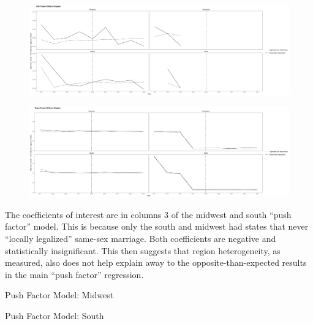 \documentclass[12pt,letterpaper]{article}
\begin{document}
\begin{figure}[p]
    \centering
    \includegraphics[width=1\linewidth]{outputs/summary_stats/region_post_diffs.png}
    \caption{}
    \label{fig: region_post_diffs}
\end{figure}

\begin{figure}[p]
    \centering
    \includegraphics[width=1\linewidth]{outputs/summary_stats/region_ante_diffs.png}
    \caption{}
    \label{fig: region_ante_diffs}
\end{figure}

The coefficients of interest are in columns 3 of the midwest and south “push factor” model. This is because only the south and midwest had states that never “locally legalized” same-sex marriage. Both coefficients are negative and statistically insignificant. This then suggests that region heterogeneity, as measured, also does not help explain away to the opposite-than-expected results in the main “push factor” regression. 

\clearpage
\begin{table}[p] %
    \centering
    \caption{Push Factor Model: Midwest}
    \label{tab: midwest_exante_model}
    
\end{table}
\begin{table}[p]
    \centering
    \caption{Push Factor Model: South}
    \label{tab: south_exante_model}
    
\end{table}
\end{document}
